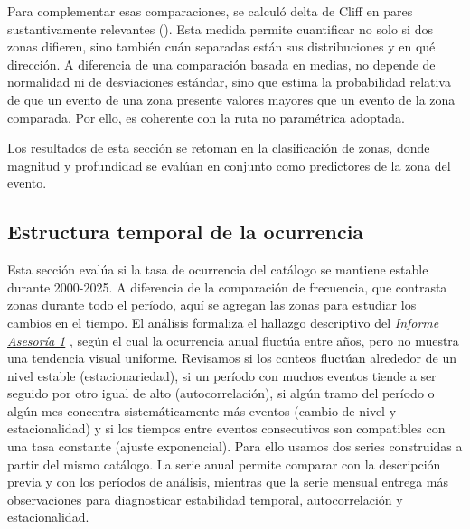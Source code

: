 \documentclass[
  spanish,
  letterpaper,
  DIV=11,
  numbers=noendperiod]{scrartcl}
\newcommand{\asesoriaExternalLink}[2]{%
  {\hypersetup{urlcolor=asesoriaLinkColor}\href{#1}{\textcolor{asesoriaLinkColor}{\emph{#2}}}}%
}
\begin{document}
Para complementar esas comparaciones, se calculó delta de Cliff en pares
sustantivamente relevantes (). Esta
medida permite cuantificar no solo si dos zonas difieren, sino también
cuán separadas están sus distribuciones y en qué dirección. A diferencia
de una comparación basada en medias, no depende de normalidad ni de
desviaciones estándar, sino que estima la probabilidad relativa de que
un evento de una zona presente valores mayores que un evento de la zona
comparada. Por ello, es coherente con la ruta no paramétrica adoptada.

Los resultados de esta sección se retoman en la clasificación de zonas,
donde magnitud y profundidad se evalúan en conjunto como predictores de
la zona del evento.

\subsection{Estructura temporal de la
ocurrencia}\label{sec-met-temporal}

Esta sección evalúa si la tasa de ocurrencia del catálogo se mantiene
estable durante 2000-2025. A diferencia de la comparación de frecuencia,
que contrasta zonas durante todo el período, aquí se agregan las zonas
para estudiar los cambios en el tiempo. El análisis formaliza el
hallazgo descriptivo del
\asesoriaExternalLink{https://mariajosevn.github.io/USGS-earthquake-analysis/Informes\%20Quarto/Informe\%20Asesor\%C3\%ADa\%201/Informe\%20Asesor\%C3\%ADa\%201\%20-\%20Actual.pdf}{Informe Asesoría 1},
según el cual la ocurrencia anual fluctúa entre años, pero no muestra
una tendencia visual uniforme. Revisamos si los conteos fluctúan
alrededor de un nivel estable (estacionariedad), si un período con
muchos eventos tiende a ser seguido por otro igual de alto
(autocorrelación), si algún tramo del período o algún mes concentra
sistemáticamente más eventos (cambio de nivel y estacionalidad) y si los
tiempos entre eventos consecutivos son compatibles con una tasa
constante (ajuste exponencial). Para ello usamos dos series construidas
a partir del mismo catálogo. La serie anual permite comparar con la
descripción previa y con los períodos de análisis, mientras que la serie
mensual entrega más observaciones para diagnosticar estabilidad
temporal, autocorrelación y estacionalidad.
\end{document}
